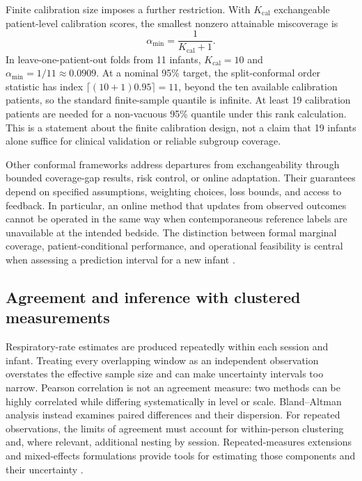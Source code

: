 Finite calibration size imposes a further restriction. With $K_{\mathrm{cal}}$ exchangeable
patient-level calibration scores, the smallest nonzero attainable miscoverage is
\begin{equation}
  \alpha_{\min}=\frac{1}{K_{\mathrm{cal}}+1}.
  \label{eq:ch2_finite_k}
\end{equation}
In leave-one-patient-out folds from 11 infants, $K_{\mathrm{cal}}=10$ and
$\alpha_{\min}=1/11\approx0.0909$. At a nominal 95\% target, the split-conformal order statistic
has index $\lceil(10+1)0.95\rceil=11$, beyond the ten available calibration patients, so the
standard finite-sample quantile is infinite. At least 19 calibration patients are needed for a
non-vacuous 95\% quantile under this rank calculation. This is a statement about the finite
calibration design, not a claim that 19 infants alone suffice for clinical validation or reliable
subgroup coverage.

{\sloppy
Other conformal frameworks address departures from exchangeability through bounded coverage-gap
results, risk control, or online adaptation. Their guarantees depend on specified assumptions,
weighting choices, loss bounds, and access to feedback. In particular, an online method that updates
from observed outcomes cannot be operated in the same way when contemporaneous reference labels
are unavailable at the intended bedside. The distinction between formal marginal coverage,
patient-conditional performance, and operational feasibility is central when assessing a
prediction interval for a new infant \citep{barber2023conformal,angelopoulos2024conformal,gibbs2024conformal}.
\par}

\subsection{Agreement and inference with clustered measurements}

Respiratory-rate estimates are produced repeatedly within each session and infant. Treating every
overlapping window as an independent observation overstates the effective sample size and can make
uncertainty intervals too narrow. Pearson correlation is not an agreement measure: two methods
can be highly correlated while differing systematically in level or scale. Bland--Altman analysis
instead examines paired differences and their dispersion. For repeated observations, the limits
of agreement must account for within-person clustering and, where relevant, additional nesting by
session. Repeated-measures extensions and mixed-effects formulations provide tools for estimating
those components and their uncertainty \citep{bland1986statistical,bland1999measuring,bland2007agreement,zou2013confidence,parker2016application}.

